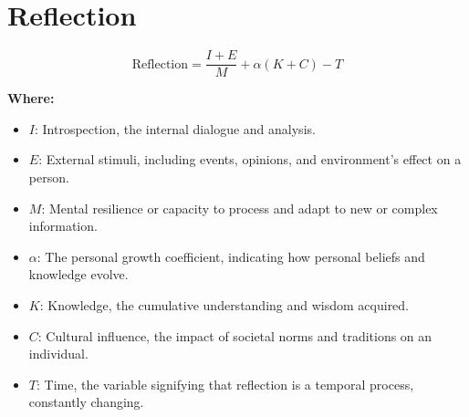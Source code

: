 \chapter{Reflection}

\begin{equation}
\text{Reflection} = \frac{I + E}{M} + \alpha (K + C) - T
\end{equation}

\textbf{Where:}

\begin{itemize}
    \item $I$: Introspection, the internal dialogue and analysis.
    \item $E$: External stimuli, including events, opinions, and environment's effect on a person.
    \item $M$: Mental resilience or capacity to process and adapt to new or complex information.
    \item $\alpha$: The personal growth coefficient, indicating how personal beliefs and knowledge evolve.
    \item $K$: Knowledge, the cumulative understanding and wisdom acquired.
    \item $C$: Cultural influence, the impact of societal norms and traditions on an individual.
    \item $T$: Time, the variable signifying that reflection is a temporal process, constantly changing.
\end{itemize}